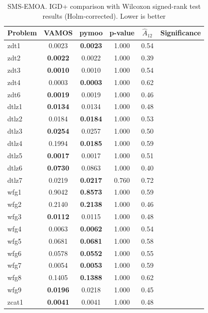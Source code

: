 \documentclass[journal]{IEEEtran}
\newcommand{\xmark}{\ding{55}}
\begin{document}
\begin{table}[htbp]
\centering
\caption{SMS-EMOA. IGD+ comparison with Wilcoxon signed-rank test results (Holm-corrected). Lower is better}
\label{tab:stats_igd_plus_smsemoa}
\begin{tabular}{lccccc}
\toprule
\textbf{Problem} & \textbf{VAMOS} & \textbf{pymoo} & \textbf{p-value} & \textbf{$\hat{A}_{12}$} & \textbf{Significance} \\
\midrule
zdt1 & 0.0023 & \textbf{0.0023} & 1.000 & 0.54 &  \xmark \\
zdt2 & \textbf{0.0022} & 0.0022 & 1.000 & 0.39 &  \xmark \\
zdt3 & \textbf{0.0010} & 0.0010 & 1.000 & 0.54 &  \xmark \\
zdt4 & 0.0003 & \textbf{0.0003} & 1.000 & 0.62 &  \xmark \\
zdt6 & \textbf{0.0019} & 0.0019 & 1.000 & 0.46 &  \xmark \\
dtlz1 & \textbf{0.0134} & 0.0134 & 1.000 & 0.48 &  \xmark \\
dtlz2 & 0.0184 & \textbf{0.0184} & 1.000 & 0.53 &  \xmark \\
dtlz3 & \textbf{0.0254} & 0.0257 & 1.000 & 0.50 &  \xmark \\
dtlz4 & 0.1994 & \textbf{0.0185} & 1.000 & 0.59 &  \xmark \\
dtlz5 & \textbf{0.0017} & 0.0017 & 1.000 & 0.51 &  \xmark \\
dtlz6 & \textbf{0.0730} & 0.0863 & 1.000 & 0.40 &  \xmark \\
dtlz7 & 0.0219 & \textbf{0.0217} & 0.760 & 0.72 &  \xmark \\
wfg1 & 0.9042 & \textbf{0.8573} & 1.000 & 0.59 &  \xmark \\
wfg2 & 0.2140 & \textbf{0.2138} & 1.000 & 0.46 &  \xmark \\
wfg3 & \textbf{0.0112} & 0.0115 & 1.000 & 0.48 &  \xmark \\
wfg4 & 0.0063 & \textbf{0.0062} & 1.000 & 0.54 &  \xmark \\
wfg5 & 0.0681 & \textbf{0.0681} & 1.000 & 0.58 &  \xmark \\
wfg6 & 0.0578 & \textbf{0.0552} & 1.000 & 0.55 &  \xmark \\
wfg7 & 0.0054 & \textbf{0.0053} & 1.000 & 0.59 &  \xmark \\
wfg8 & 0.1405 & \textbf{0.1388} & 1.000 & 0.62 &  \xmark \\
wfg9 & \textbf{0.0196} & 0.0218 & 1.000 & 0.45 &  \xmark \\
zcat1 & \textbf{0.0041} & 0.0041 & 1.000 & 0.48 &  \xmark \\

\end{tabular}
\end{table}
\end{document}
